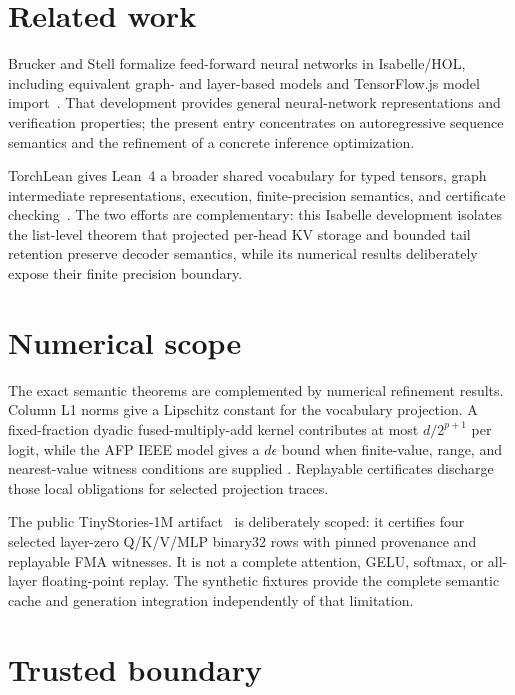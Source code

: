 \documentclass[11pt,a4paper]{article}
\begin{document}
\section{Related work}

Brucker and Stell formalize feed-forward neural networks in Isabelle/HOL,
including equivalent graph- and layer-based models and TensorFlow.js model
import~\cite{BruckerStell2023,NeuralNetworksAFP2025}.  That development
provides general neural-network representations and verification properties;
the present entry concentrates on autoregressive sequence semantics and the
refinement of a concrete inference optimization.

TorchLean gives Lean~4 a broader shared vocabulary for typed tensors, graph
intermediate representations, execution, finite-precision semantics, and
certificate checking~\cite{GeorgeEtAl2026TorchLean}.  The two efforts are
complementary: this Isabelle development isolates the list-level theorem that
projected per-head KV storage and bounded tail retention preserve decoder
semantics, while its numerical results deliberately expose their finite
precision boundary.

\section{Numerical scope}

The exact semantic theorems are complemented by numerical refinement results.
Column L1 norms give a Lipschitz constant for the vocabulary projection.  A
fixed-fraction dyadic fused-multiply-add kernel contributes at most
$d/2^{p+1}$ per logit, while the AFP IEEE model gives a $d\epsilon$ bound when
finite-value, range, and nearest-value witness conditions are supplied
\cite{YuIEEE2013}.  Replayable certificates discharge those local obligations
for selected projection traces.

The public TinyStories-1M artifact~\cite{EldanLi2023TinyStoriesCheckpoint} is
deliberately scoped: it certifies four selected layer-zero Q/K/V/MLP binary32
rows with pinned provenance and replayable FMA witnesses.  It is not a
complete attention, GELU, softmax, or all-layer floating-point replay.  The
synthetic fixtures provide the complete semantic cache and generation
integration independently of that limitation.

\section{Trusted boundary}
\end{document}
